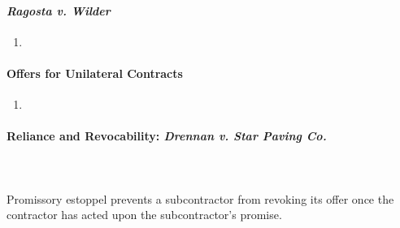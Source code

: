 \paragraph{\emph{Ragosta v. Wilder}}

\begin{enumerate}
    \item %
\end{enumerate}

\paragraph{Offers for Unilateral Contracts}

\begin{enumerate}
    \item %
\end{enumerate}

\paragraph{Reliance and Revocability: \emph{Drennan v. Star Paving Co.}}
~\\\\
Promissory estoppel prevents a subcontractor from revoking its offer once the 
contractor has acted upon the subcontractor's promise.

